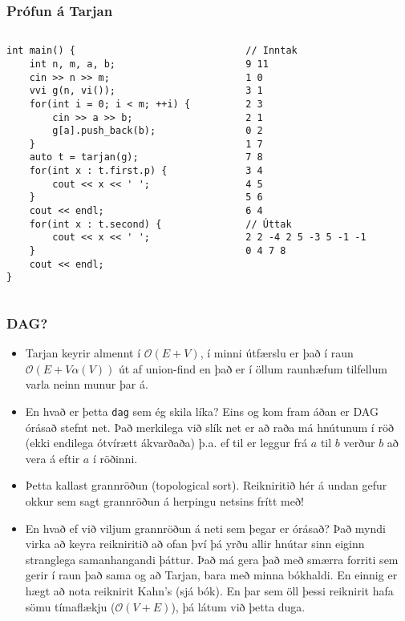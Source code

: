 \documentclass{beamer}
\begin{document}
\begin{frame}[fragile]
\frametitle{Prófun á Tarjan}

\begin{columns}
\begin{column}{0.5\textwidth}
\begin{small}
\begin{verbatim}
int main() {
    int n, m, a, b;
    cin >> n >> m;
    vvi g(n, vi());
    for(int i = 0; i < m; ++i) {
        cin >> a >> b;
        g[a].push_back(b);
    }
    auto t = tarjan(g);
    for(int x : t.first.p) {
        cout << x << ' ';
    }
    cout << endl;
    for(int x : t.second) {
        cout << x << ' ';
    }
    cout << endl;
}
\end{verbatim}
\end{small}
\end{column}

\begin{column}{0.5\textwidth}
\begin{verbatim}
// Inntak
9 11
1 0
3 1
2 3
2 1
0 2
1 7
7 8
3 4
4 5
5 6
6 4
// Úttak
2 2 -4 2 5 -3 5 -1 -1 
0 4 7 8 
\end{verbatim}
\end{column}
\end{columns}

\end{frame}

\begin{frame}
\frametitle{DAG?}

\begin{itemize}

\item<1-> Tarjan keyrir almennt í $\mathcal{O}(E + V)$, í minni útfærslu er það í raun $\mathcal{O}(E + V\alpha(V))$ út af union-find en það er í öllum raunhæfum tilfellum varla neinn munur þar á.

\item<2-> En hvað er þetta \texttt{dag} sem ég skila líka? Eins og kom fram áðan er DAG órásað stefnt net. Það merkilega við slík net er að raða má hnútunum í röð (ekki endilega ótvírætt ákvarðaða) þ.a. ef til er leggur frá $a$ til $b$ verður $b$ að vera á eftir $a$ í röðinni.

\item<3-> Þetta kallast grannröðun (topological sort). Reikniritið hér á undan gefur okkur sem sagt grannröðun á herpingu netsins frítt með!

\item<4-> En hvað ef við viljum grannröðun á neti sem þegar er órásað? Það myndi virka að keyra reikniritið að ofan því þá yrðu allir hnútar sinn eiginn stranglega samanhangandi þáttur. Það má gera það með smærra forriti sem gerir í raun það sama og að Tarjan, bara með minna bókhaldi. En einnig er hægt að nota reiknirit Kahn's (sjá bók). En þar sem öll þessi reiknirit hafa sömu tímaflækju ($\mathcal{O}(V + E)$), þá látum við þetta duga.

\end{itemize}

\end{frame}
\end{document}
